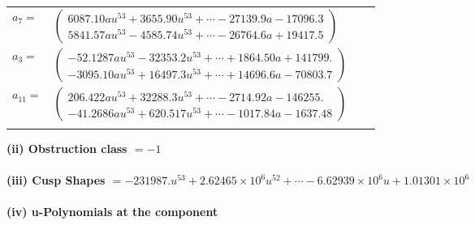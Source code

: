 \documentclass[1p]{elsarticle_modified}
\theoremstyle{definition}
\begin{document}
\begin{tabular}{m{7pt} m{180pt} m{7pt} m{180pt} }
\flushright $a_{7}=$&$\begin{pmatrix}6087.10 a u^{53}+3655.90 u^{53}+\cdots-27139.9 a-17096.3\\5841.57 a u^{53}-4585.74 u^{53}+\cdots-26764.6 a+19417.5\end{pmatrix}$ \\
\flushright $a_{3}=$&$\begin{pmatrix}-52.1287 a u^{53}-32353.2 u^{53}+\cdots+1864.50 a+141799.\\-3095.10 a u^{53}+16497.3 u^{53}+\cdots+14696.6 a-70803.7\end{pmatrix}$ \\
\flushright $a_{11}=$&$\begin{pmatrix}206.422 a u^{53}+32288.3 u^{53}+\cdots-2714.92 a-146255.\\-41.2686 a u^{53}+620.517 u^{53}+\cdots-1017.84 a-1637.48\end{pmatrix}$\\&\end{tabular}
\flushleft \textbf{(ii) Obstruction class $= -1$}\\~\\
\flushleft \textbf{(iii) Cusp Shapes $= -231987. u^{53}+2.62465\times10^{6} u^{52}+\cdots-6.62939\times10^{6} u+1.01301\times10^{6}$}\\~\\
\newpage\renewcommand{\arraystretch}{1}
\flushleft \textbf{(iv) u-Polynomials at the component}\newline \\
\end{document}
